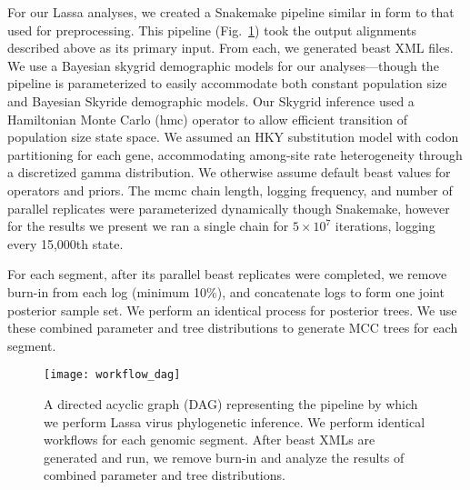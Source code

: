 For our Lassa analyses, we created a Snakemake pipeline similar in form to that used for preprocessing.
This pipeline (Fig.~\ref{fig:workflow_dag}) took the output alignments described above as its primary input.
From each, we generated \gls{beast} XML files.
We use a Bayesian skygrid demographic models for our analyses---though the pipeline is parameterized to easily accommodate both constant population size and Bayesian Skyride demographic models.
Our Skygrid inference used a Hamiltonian Monte Carlo (\gls{hmc}) operator to allow efficient transition of population size state space\cite{baele2020hamiltonian}.
We assumed an HKY substitution model with codon partitioning for each gene, accommodating among-site rate heterogeneity through a discretized gamma distribution.
We otherwise assume default \gls{beast} values for operators and priors.
The \gls{mcmc} chain length, logging frequency, and number of parallel replicates were parameterized dynamically though Snakemake, however for the results we present we ran a single chain for $5\times10^7$ iterations, logging every 15,000th state.

For each segment, after its parallel \gls{beast} replicates were completed, we remove burn-in from each log (minimum 10\%), and concatenate logs to form one joint posterior sample set.
We perform an identical process for posterior trees.
We use these combined parameter and tree distributions to generate MCC trees for each segment.

\begin{figure}[ht]
  \centering
  \medskip
  \texttt{[image: workflow\_dag]}
  \caption[Lassa phylogenetics pipeline]{A directed acyclic graph (DAG) representing the pipeline by which we perform Lassa virus phylogenetic inference. We perform identical workflows for each genomic segment. After \gls{beast} XMLs are generated and run, we remove burn-in and analyze the results of combined parameter and tree distributions.}
  \label{fig:workflow_dag}
\end{figure}

\cleardoublepage

